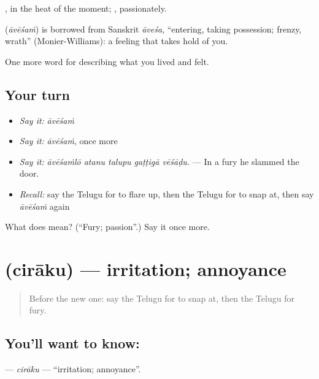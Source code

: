 , in the heat of the moment; , passionately.

\begin{cousinweb}
\textbf{} (\emph{āvēśaṁ}) is borrowed from Sanskrit \emph{āveśa}, \textquotedblleft{}entering, taking possession; frenzy, wrath\textquotedblright{} (Monier-Williams): a feeling that takes hold of you.
\end{cousinweb}

\begin{grammarlens}[title={What you've built}]
One more word for describing what you lived and felt.
\end{grammarlens}

\subsection*{Your turn}
\begin{itemize}
\raggedright
  \item \emph{Say it:} \emph{āvēśaṁ}
  \item \emph{Say it:} \emph{āvēśaṁ}, once more
  \item \emph{Say it:} \emph{āvēśaṁlō atanu talupu gaṭṭigā vēśāḍu.} — In a fury he slammed the door.
  \item \emph{Recall:} say the Telugu for to flare up, then the Telugu for to snap at, then say \emph{āvēśaṁ} again
\end{itemize}

\begin{tcolorbox}[breakable,colback=teal!4,colframe=teal!35!black,title={Before you move on}]
What does  mean? (\textquotedblleft{}Fury; passion\textquotedblright{}.) Say it once more.
\end{tcolorbox}
\section[\texorpdfstring{\te{చిరాకు} (cirāku)}{చిరాకు (cirāku)}]{ (cirāku) — irritation; annoyance}

\label{lesson:TE-C497-ciraku}



\begin{quote}
Before the new one: say the Telugu for to snap at, then the Telugu for fury.
\end{quote}

\subsection*{You'll want to know: }
\textbf{} — \emph{cirāku} — \textquotedblleft{}irritation; annoyance\textquotedblright{}.

